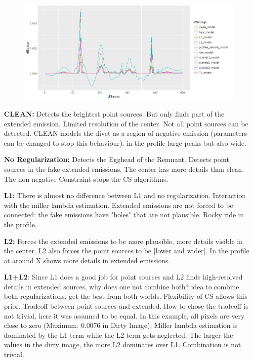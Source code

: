 \begin{figure}
	\includegraphics[width=\linewidth, trim={18px 19px 18px 18px}, clip]{./chapters/05.results/comparison_temp.png}
\end{figure}

\textbf{CLEAN:} Detects the brightest point sources. But only finds part of the extended emission. Limited resolution of the center. Not all point sources can be detected. CLEAN models the divet as a region of negative emission (parameters can be changed to stop this behaviour). in the profile large peaks but also wide.  

\textbf{No Regularization:} Detects the Egghead of the Remnant. Detects point sources in the fake extended emissions. The center has more details than clean. 
The non-negative Constraint stops the CS algorithms. 

\textbf{L1:} There is almost no difference between L1 and no regularization. Interaction with the miller lambda estimation. Extended emissions are not forced to be connected: the fake emissions have "holes" that are not plausible. Rocky ride in the profile.

\textbf{L2:} Forces the extended emissions to be more plausible, more details visible in the center. L2 also forces the point sources to be [lower and wider]. In the profile at around X shows more details in extended emissions.

\textbf{L1+L2}: Since L1 does a good job for point sources and L2 finds high-resolved details in extended sources, why does one not combine both? 
idea to combine both regularizations, get the best from both worlds. Flexibility of CS allows this prior. Tradeoff between point sources and extended. How to chose the tradeoff is not trivial, here it was assumed to be  equal. In this example, all pixels are very close to zero (Maximum: 0.0076 in Dirty Image), Miller lambda estimation is dominated by the L1 term while the L2 term gets neglected. The larger the values in the dirty image, the more L2 dominates over L1. Combination is not trivial.

